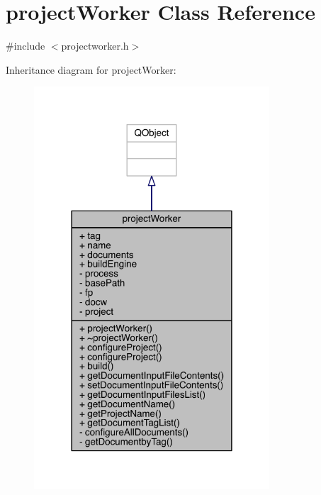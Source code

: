 \hypertarget{classproject_worker}{\section{project\+Worker Class Reference}
\label{classproject_worker}
}


{\ttfamily \#include $<$projectworker.\+h$>$}



Inheritance diagram for project\+Worker\+:\nopagebreak
\begin{figure}[H]
\begin{center}
\leavevmode
\includegraphics[width=249pt]{classproject_worker__inherit__graph}
\end{center}
\end{figure}


